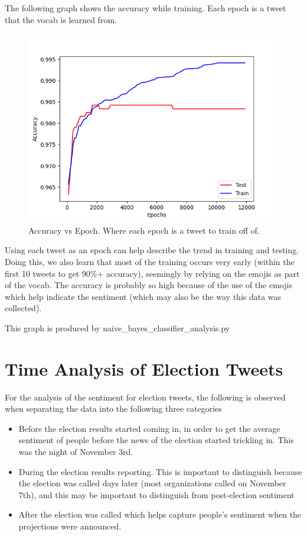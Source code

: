 \documentclass{article}
\begin{document}
The following graph shows the accuracy while training. Each epoch is a tweet that the vocab is learned from. 

\begin{figure}[h!]
    \centering
    \includegraphics[width=1\linewidth]{plots/Epoch_Accuracy.png}
    \caption*{Accuracy vs Epoch. Where each epoch is a tweet to train off of.}
\end{figure}    

\noindent Using each tweet as an epoch can help describe the trend in training and testing. Doing this, we also learn that most of the training occurs very early (within the first 10 tweets to get 90\%+ accuracy), seemingly by relying on the emojis as part of the vocab.
The accuracy is probably so high because of the use of the emojis which help indicate the sentiment (which may also be the way this data was collected).

\noindent This graph is produced by naive\_bayes\_classifier\_analysis.py

\section{Time Analysis of Election Tweets}

For the analysis of the sentiment for election tweets, the following is observed when separating the data into the following three categories
\begin{itemize}
    \item Before the election results started coming in, in order to get the average sentiment of people before the news of the election started trickling in. This was the night of November 3rd.
    \item During the election results reporting. This is important to distinguish because the election was called days later (most organizations called on November 7th), and this may be important to distinguish from post-election sentiment
    \item After the election was called which helps capture people's sentiment when the projections were announced.
\end{itemize}
\end{document}
